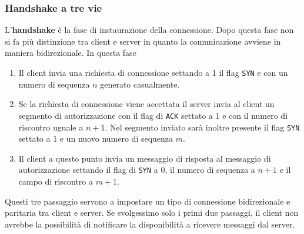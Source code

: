\subsubsection{Handshake a tre vie}
L'\textbf{handshake} è la fase di instaurazione della connessione. Dopo questa fase non si fa più
distinzione tra client e server in quanto la comunicazione avviene in maniera bidirezionale. In 
questa fase
\begin{enumerate}
	\item Il client invia una richiesta di connessione settando a 1 il flag \verb|SYN| e con un 
		numero di sequenza $n$ generato casualmente.
	\item Se la richiesta di connessione viene accettata il server invia al client un segmento di
		autorizzazione con il flag di \verb|ACK| settato a 1 e con il numero di riscontro uguale
		a $n+1$. Nel segmento inviato sarà inoltre presente il flag \verb|SYN| settato a 1 e un
		nuovo numero di sequenza $m$.
	\item Il client a questo punto invia un messaggio di risposta al messaggio di autorizzazione
		settando il flag di \verb|SYN| a 0, il numero di sequenza a $n+1$ e il campo di riscontro
		a $m+1$.
\end{enumerate}
Questi tre passaggio servono a impostare un tipo di connessione bidirezionale e paritaria tra
client e server. Se svolgessimo solo i primi due passaggi, il client non avrebbe la possibilità
di notificare la disponibilità a ricevere messaggi dal server.

